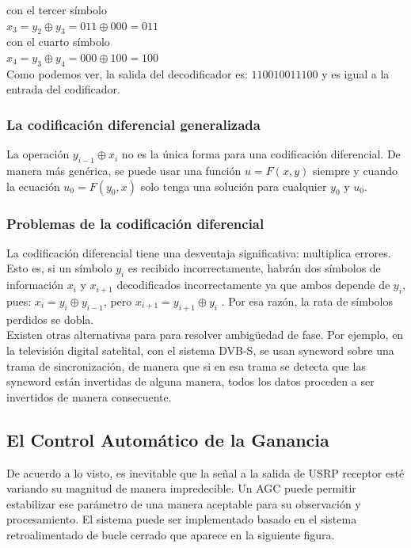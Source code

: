 con el tercer símbolo\\

$x_3=y_2 \oplus y_3 =011 \oplus 000=011$\\

con el cuarto símbolo\\

$x_4=y_3 \oplus y_4 =000 \oplus 100=100$\\

Como podemos ver, la salida del decodificador es: $110010011100$ y es igual a la entrada del codificador.

\subsubsection{La codificación diferencial generalizada}

La operación $y_{i-1} \oplus x_i$ no es la única forma para una codificación diferencial. De manera más genérica, se puede usar una función $u=F(x,y)$ siempre y cuando la ecuación $u_0 = F(y_0,x)$ solo tenga una solución para cualquier $y_0$ y $u_0$. 

\subsubsection{Problemas de la codificación diferencial}

La codificación diferencial tiene una desventaja significativa: multiplica errores. Esto es, si un símbolo $y_i$ es recibido incorrectamente, habrán dos símbolos de información $x_i$ y $x_{i+1}$ decodificados incorrectamente ya que ambos depende de $y_i$, pues: $x_i = y_i \oplus y_{i-1}$, pero $x_{i+1}= y_{i+1} \oplus y_i$ . Por esa razón, la rata de símbolos perdidos se dobla. \\

Existen otras alternativas para para resolver ambigüedad de fase. Por ejemplo, en la televisión digital satelital, con el sistema DVB-S, se usan syncword sobre una trama de sincronización, de manera que si en esa trama se detecta que las syncword están invertidas de alguna manera, todos los datos proceden a ser invertidos de manera consecuente. \\

\subsection{El Control Automático de la Ganancia}
De acuerdo a lo visto, es inevitable que la señal a la salida de USRP receptor esté variando su magnitud de manera impredecible. Un AGC puede permitir estabilizar ese parámetro de una manera aceptable para su observación y procesamiento. El sistema puede ser implementado basado en el sistema retroalimentado de bucle cerrado que aparece en la siguiente figura. 

